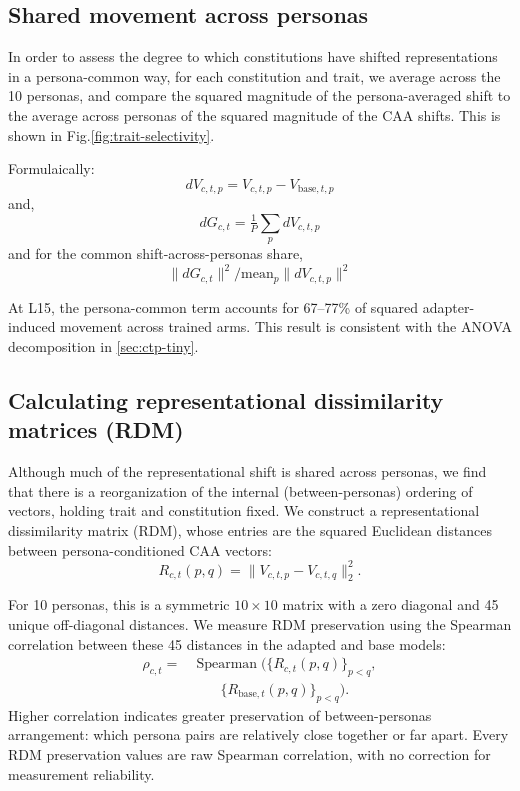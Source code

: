 \documentclass[11pt]{article}
\begin{document}
\subsection{Shared movement across personas}
\label{app:broad-shift}
In order to assess the degree to which constitutions have shifted representations in a persona-common way, for each constitution and trait, we average across the 10 personas, and compare the squared magnitude of the persona-averaged shift to the average across personas of the squared magnitude of the CAA shifts. This is shown in Fig.\ref{fig:trait-selectivity}.

Formulaically:
\[
dV_{c,t,p} = V_{c,t,p}-V_{\mathrm{base},t,p}
\]
and,
\[
dG_{c,t} = \tfrac{1}{P}\sum_{p}dV_{c,t,p}
\]
and for the common shift-across-personas share,
\[
\|dG_{c,t}\|^2\big/\mathrm{mean}_p\|dV_{c,t,p}\|^2
\]

At L15, the persona-common term accounts for 67--77\% of squared adapter-induced movement across trained arms. This result is consistent with the ANOVA decomposition in \ref{sec:ctp-tiny}.

\subsection{Calculating representational dissimilarity matrices (RDM)}
\label{app:rdm}
Although much of the representational shift is shared across personas, we find that there is a reorganization of the internal (between-personas) ordering of vectors, holding trait and constitution fixed. We construct a representational dissimilarity matrix (RDM), whose entries are the squared
Euclidean distances between persona-conditioned CAA vectors:
\begin{equation}
R_{c,t}(p,q)
=
\|V_{c,t,p}-V_{c,t,q}\|_2^2.
\end{equation}

For 10 personas, this is a symmetric $10\times10$ matrix with a zero diagonal and 45 unique off-diagonal distances. We measure RDM preservation using the Spearman correlation between these 45 distances in the adapted and base models:
\begin{equation}
\begin{aligned}
\rho_{c,t}
={}&
\operatorname{Spearman}\!\big(
    \{R_{c,t}(p,q)\}_{p<q},\\
&\qquad\{R_{\mathrm{base},t}(p,q)\}_{p<q}
\big).
\end{aligned}
\end{equation}
Higher correlation indicates greater preservation of between-personas arrangement: which persona pairs are relatively close together or far apart. Every RDM preservation values are raw Spearman correlation, with no correction for measurement reliability. 
\end{document}
